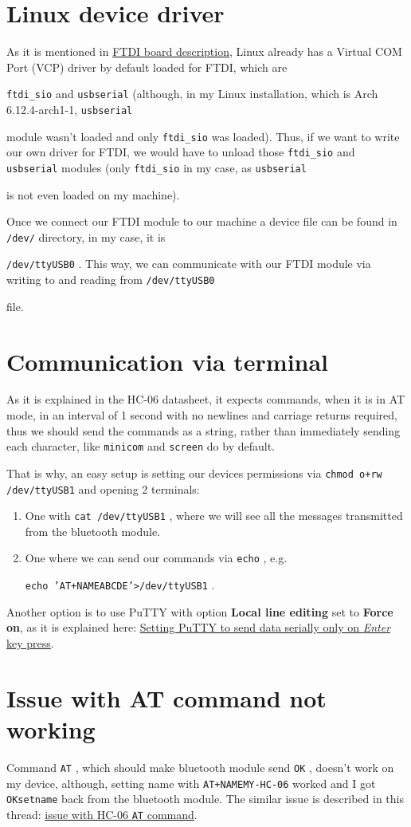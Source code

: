 \documentclass[12pt]{book}
\newcommand{\code}[1]{
    {\color{blue}\texttt{#1}}
}
\begin{document}
\section{Linux device driver}
As it is mentioned in 
\href{https://www.digitec.ch/en/s1/product/deek-robot-dk-ftdi-isp-breakout-335v-power-component-electronics-modules-5997850}{
FTDI board description}, Linux already has a Virtual COM Port (VCP) driver by default loaded for FTDI, which are 
\code{ftdi\_sio} and \code{usbserial} (although, in my Linux installation, which is Arch 6.12.4-arch1-1, \code{usbserial} 
module wasn't loaded and only \code{ftdi\_sio} was loaded). Thus, if we want to write our own driver for FTDI, we would 
have to unload those \code{ftdi\_sio} and \code{usbserial} modules (only \code{ftdi\_sio} in my case, as \code{usbserial}
is not even loaded on my machine).

Once we connect our FTDI module to our machine a device file can be found in \code{/dev/} directory, in my case, it is 
\code{/dev/ttyUSB0}. This way, we can communicate with our FTDI module via writing to and reading from \code{/dev/ttyUSB0}
file.

\section{Communication via terminal}
As it is explained in the HC-06 datasheet, it expects commands, when it is in AT mode, in an interval of 1 second with 
no newlines and carriage returns required, thus we should send the commands as a string, rather than immediately sending
each character, like \code{minicom} and \code{screen} do by default.

That is why, an easy setup is setting our devices permissions via \code{chmod o+rw /dev/ttyUSB1} and opening 2 terminals:
\begin{enumerate}
    \item One with \code{cat /dev/ttyUSB1}, where we will see all the messages transmitted from the bluetooth module.
    \item One where we can send our commands via \code{echo}, e.g. 
    
        \code{echo 'AT+NAMEABCDE'>/dev/ttyUSB1}.
\end{enumerate}

Another option is to use PuTTY with option \textbf{Local line editing} set to \textbf{Force on}, as it is explained here:
\href{https://stackoverflow.com/questions/4999280/how-to-send-characters-in-putty-serial-communication-only-when-pressing-enter}{
Setting PuTTY to send data serially only on \emph{Enter} key press}.

\section{Issue with AT command not working}
Command \code{AT}, which should make bluetooth module send \code{OK}, doesn't work on my device, although, setting name
with \code{AT+NAMEMY-HC-06} worked and I got \code{OKsetname} back from the bluetooth module. The similar issue is 
described in this thread: \href{https://forum.arduino.cc/t/solved-hc-06-just-wont-talk-with-windows-for-at-commands/665785/8}{
issue with HC-06 \code{AT} command}.
\end{document}
